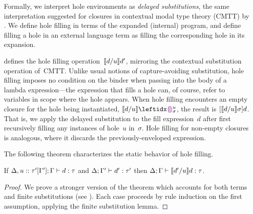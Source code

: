 
Formally, 
%
we interpret hole environments as \emph{delayed substitutions},
the same interpretation suggested for closures in contextual modal
type theory (CMTT) by \citet{Nanevski2008}.
%
%
We define hole filling in terms of the expanded (internal) program,
and define filling a hole in an external language term as filling the
corresponding hole in its expansion.

 defines the hole filling operation~$\llbracket d / u\rrbracket d'$,
mirroring the contextual substitution operation of~CMTT.
%
Unlike usual notions of capture-avoiding substitution, 
hole filling imposes no condition on the binder when passing into the
body of a lambda expression---the expression that fills a hole can, of
course, refer to variables in scope where the hole appears.
%
When hole filling encounters an empty closure for the hole being
instantiated, $\instantiate{d}{u}{\dehole{u}{\sigma}{}}$, the result
is $[\llbracket d / u\rrbracket \sigma]d$.
%
That is, we apply the delayed substitution to the fill expression~$d$
after first recursively filling any instances of hole~$u$ in~$\sigma$.
%
Hole filling for non-empty closures is analogous, where it discards
the previously-enveloped expression.
%
%
%



The following theorem characterizes the static behavior of hole filling.
\begin{thm}[Filling]
  If $\Delta, u :: \tau'[\Gamma']; \Gamma \vdash d : \tau$
  and $\Delta; \Gamma' \vdash d' : \tau'$
  then $\Delta; \Gamma \vdash \llbracket d' / u\rrbracket d : \tau$.
\begin{proof}
We prove a stronger version of the theorem which accounts for both
terms and finite substitutions (see \cite{Nanevski2008}).
%
Each case proceeds by rule induction on the first assumption, applying
the finite substitution lemma.
\end{proof}
\end{thm}

